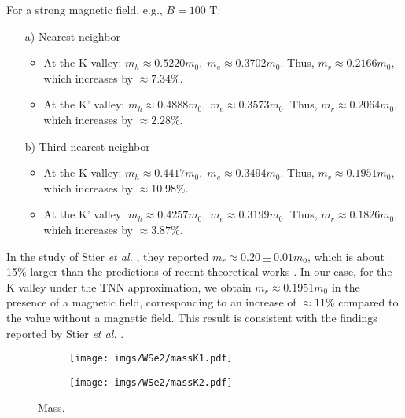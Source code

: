 \documentclass{article}
\begin{document}
For a strong magnetic field, e.g., $B = 100$ T:
\begin{itemize}
	\item[a)] Nearest neighbor
	      \begin{itemize}
		      \item At the K valley: $m_{h} \approx 0.5220 m_{0},\; m_{e} \approx 0.3702 m_{0}$. Thus, $m_{r} \approx 0.2166 m_{0}$, which increases by $\approx 7.34\%$.
		      \item At the K' valley: $m_{h} \approx 0.4888 m_{0},\; m_{e} \approx 0.3573 m_{0}$. Thus, $m_{r} \approx 0.2064 m_{0}$, which increases by $\approx 2.28\%$.
	      \end{itemize}
	\item[b)] Third nearest neighbor
	      \begin{itemize}
		      \item At the K valley: $m_{h} \approx 0.4417 m_{0},\; m_{e} \approx 0.3494 m_{0}$. Thus, $m_{r} \approx 0.1951 m_{0}$, which increases by $\approx 10.98\%$.
		      \item At the K' valley: $m_{h} \approx 0.4257 m_{0},\; m_{e} \approx 0.3199 m_{0}$. Thus, $m_{r} \approx 0.1826 m_{0}$, which increases by $\approx 3.87\%$.
	      \end{itemize}
\end{itemize}

In the study of Stier \textit{et al.} \cite{stier2018}, they reported $m_{r} \approx 0.20 \pm 0.01 m_{0}$, which is about 15\% larger than the predictions of recent theoretical works \cite{berkelbach2013,kylanpaa2015}. In our case, for the K valley under the TNN approximation, we obtain $m_{r} \approx 0.1951 m_{0}$ in the presence of a magnetic field, corresponding to an increase of $\approx 11\%$ compared to the value without a magnetic field. This result is consistent with the findings reported by Stier \textit{et al.} \cite{stier2018}.

\begin{figure}[htb]
	\begin{subfigure}{0.495\textwidth}
		\centering
		\texttt{[image: imgs/WSe2/massK1.pdf]}
	\end{subfigure}
	\begin{subfigure}{0.495\textwidth}
		\centering
		\texttt{[image: imgs/WSe2/massK2.pdf]}
	\end{subfigure}
	\caption{Mass.}
\end{figure}


\newpage
\end{document}
